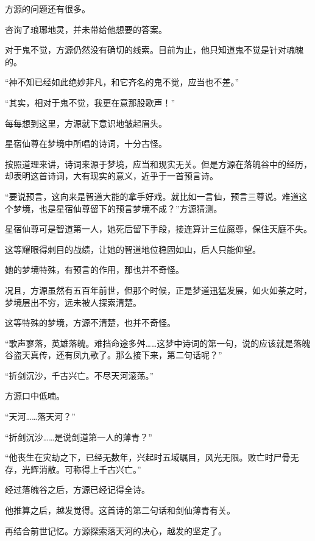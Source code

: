 
\begin{this_body}



方源的问题还有很多。

咨询了琅琊地灵，并未带给他想要的答案。

对于鬼不觉，方源仍然没有确切的线索。目前为止，他只知道鬼不觉是针对魂魄的。

“神不知已经如此绝妙非凡，和它齐名的鬼不觉，应当也不差。”

“其实，相对于鬼不觉，我更在意那股歌声！”

每每想到这里，方源就下意识地皱起眉头。

星宿仙尊在梦境中所唱的诗词，十分古怪。

按照道理来讲，诗词来源于梦境，应当和现实无关。但是方源在落魄谷中的经历，却表明这首诗词，大有现实的意义，近乎于一首预言诗。

“要说预言，这向来是智道大能的拿手好戏。就比如一言仙，预言三尊说。难道这个梦境，也是星宿仙尊留下的预言梦境不成？”方源猜测。

星宿仙尊可是智道第一人，她死后留下手段，接连算计三位魔尊，保住天庭不失。

这等耀眼得刺目的战绩，让她的智道地位稳固如山，后人只能仰望。

她的梦境特殊，有预言的作用，那也并不奇怪。

况且，方源虽然有五百年前世，但那个时候，正是梦道迅猛发展，如火如荼之时，梦境层出不穷，远未被人探索清楚。

这等特殊的梦境，方源不清楚，也并不奇怪。

“歌声寥落，英雄落魄。难挡命途多舛……这梦中诗词的第一句，说的应该就是落魄谷盗天真传，还有凤九歌了。那么接下来，第二句话呢？”

“折剑沉沙，千古兴亡。不尽天河滚荡。”

方源口中低喃。

“天河……落天河？”

“折剑沉沙……是说剑道第一人的薄青？”

“他丧生在灾劫之下，已经无数年，兴起时五域瞩目，风光无限。败亡时尸骨无存，光辉消散。可称得上千古兴亡。”

经过落魄谷之后，方源已经记得全诗。

他推算之后，越发觉得。这首诗的第二句话和剑仙薄青有关。

再结合前世记忆。方源探索落天河的决心，越发的坚定了。


\end{this_body}
